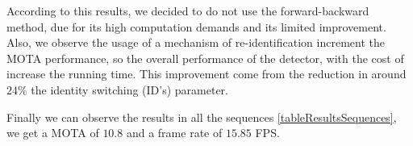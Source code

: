 \begin{table}[H]
\centering

\caption{Results algorithm global.}
\label{tableResults}
\end{table}

According to this results, we decided to do not use the forward-backward method, due for its high computation demands and its limited improvement. Also, we observe the usage of a mechanism of re-identification increment the MOTA performance, so the overall performance of the detector, with the cost of increase the running time. This improvement come from the reduction in around $24 \%$ the identity switching (ID's) parameter.

Finally we can observe the results in all the sequences \ref{tableResultsSequences}, we get a MOTA of $10.8$ and a frame rate of $15.85$ FPS. 


